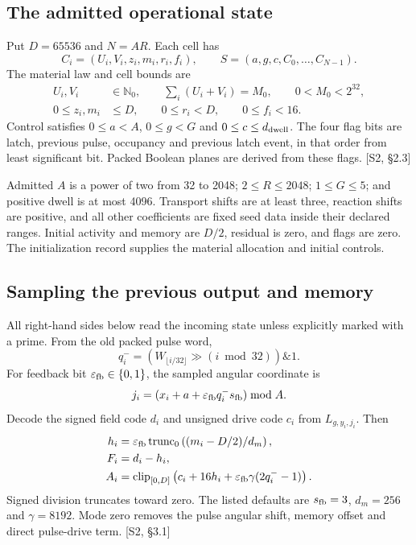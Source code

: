 \documentclass[11pt,a4paper]{article}
\numberwithin{equation}{section}
\newcommand{\src}[2]{{\sffamily\small\color{slate}[#1, #2]}}
\newcommand{\clip}{\operatorname{clip}}
\newcommand{\trunc}{\operatorname{trunc}_0}
\begin{document}
\subsection{The admitted operational state}
Put $D=65536$ and $N=AR$. Each cell has
\begin{equation}
C_i=(U_i,V_i,z_i,m_i,r_i,f_i),
\qquad S=(a,g,c,C_0,\ldots,C_{N-1}).
\end{equation}
The material law and cell bounds are
\begin{align}
U_i,V_i&\in\mathbb N_0,\qquad
\sum_i(U_i+V_i)=M_0,\qquad0<M_0<2^{32},\\
0\le z_i,m_i&\le D,\qquad0\le r_i<D,\qquad0\le f_i<16.
\end{align}
Control satisfies $0\le a<A$, $0\le g<G$ and $0\le c\le d_{\rm dwell}$. The four flag bits are latch, previous pulse, occupancy and previous latch event, in that order from least significant bit. Packed Boolean planes are derived from these flags. \src{S2}{\S2.3}

Admitted $A$ is a power of two from 32 to 2048; $2\le R\le2048$; $1\le G\le5$; and positive dwell is at most 4096. Transport shifts are at least three, reaction shifts are positive, and all other coefficients are fixed seed data inside their declared ranges. Initial activity and memory are $D/2$, residual is zero, and flags are zero. The initialization record supplies the material allocation and initial controls.

\subsection{Sampling the previous output and memory}
All right-hand sides below read the incoming state unless explicitly marked with a prime. From the old packed pulse word,
\begin{equation}
q_i^-=\left(W_{\lfloor i/32\rfloor}\gg(i\bmod32)\right)\mathbin{\&}1.
\end{equation}
For feedback bit $\varepsilon_{\rm fb}\in\{0,1\}$, the sampled angular coordinate is
\begin{equation}
j_i=(x_i+a+\varepsilon_{\rm fb}q_i^-s_{\rm fb})\bmod A.
\end{equation}
Decode the signed field code $d_i$ and unsigned drive code $c_i$ from $L_{g,y_i,j_i}$. Then
\begin{align}
h_i&=\varepsilon_{\rm fb}\trunc\left((m_i-D/2)/d_m\right),\\
F_i&=d_i-h_i,\\
A_i&=\clip_{[0,D]}\left(c_i+16h_i+
\varepsilon_{\rm fb}\gamma(2q_i^--1)\right).
\end{align}
Signed division truncates toward zero. The listed defaults are $s_{\rm fb}=3$, $d_m=256$ and $\gamma=8192$. Mode zero removes the pulse angular shift, memory offset and direct pulse-drive term. \src{S2}{\S3.1}
\end{document}

